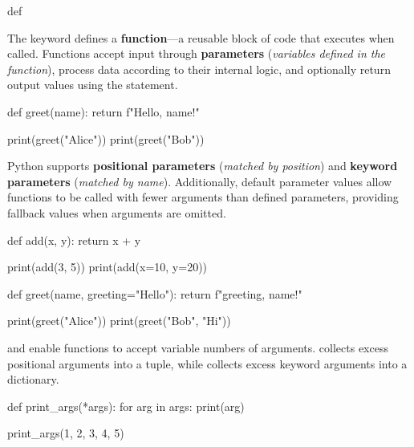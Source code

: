 \documentclass[10pt]{article}
\begin{document}
  \begin{core}[label=core:def]{def}

    The  keyword defines a \textbf{function}---a reusable block of code that executes when called. Functions accept input through \textbf{parameters} (\textit{variables defined in the function}), process data according to their internal logic, and optionally return output values using the  statement.

    \begin{pyconsole}

      def greet(name):
          return f"Hello, {name}!"
      
      print(greet("Alice"))
      print(greet("Bob"))

    \end{pyconsole}
    
    Python supports \textbf{positional parameters} (\textit{matched by position}) and \textbf{keyword parameters} (\textit{matched by name}). Additionally, default parameter values allow functions to be called with fewer arguments than defined parameters, providing fallback values when arguments are omitted.

    \begin{pyconsole}

      def add(x, y):
          return x + y
      
      print(add(3, 5))
      print(add(x=10, y=20))
      
      def greet(name, greeting="Hello"):
          return f"{greeting}, {name}!"
      
      print(greet("Alice"))
      print(greet("Bob", "Hi"))

    \end{pyconsole}
    
     and  enable functions to accept variable numbers of arguments.  collects excess positional arguments into a tuple, while  collects excess keyword arguments into a dictionary.

    \begin{pyconsole}

      def print_args(*args):
          for arg in args:
              print(arg)
      
      print_args(1, 2, 3, 4, 5)


\end{pyconsole}
\end{core}
\end{document}
